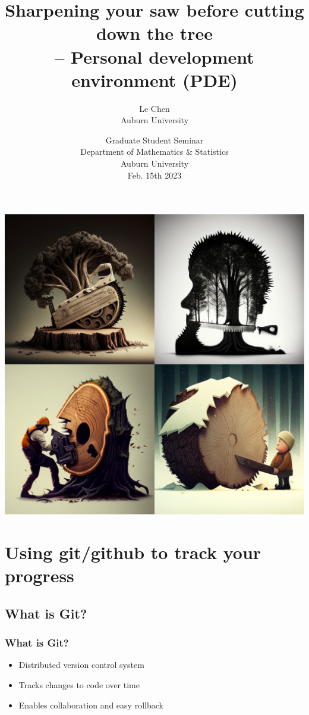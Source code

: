 \documentclass[9pt,table,xcolor=dvipsnames]{beamer}%
\title{Sharpening your saw before cutting down the tree
\\ -- Personal development environment (PDE)}%
\author{Le Chen\\
Auburn University
}
\institute[Auburn University]
{%
\pgfuseimage{Emory}
 }
\date[Columbus]{
  \footnotesize
  Graduate Student Seminar \\[1em]
  Department of Mathematics \& Statistics\\[0.5em]
  Auburn University\\[1em]
  Feb. 15th 2023\\
}
\theoremstyle{definition}
\theoremstyle{plain}
\begin{document}
\begin{frame}[noframenumbering]
  \titlepage
\end{frame}
\begin{frame}[fragile] %
  \bigskip
  \begin{center}
    \includegraphics[scale=0.25]{./figs/chenle02_Illustrate_the_idea_If_you_sharpen_the_saw_you_would.png}
  \end{center}
\end{frame}
\section{Using git/github to track your progress}
\subsection{What is Git?}
\begin{frame}
  \frametitle{What is Git?}
  \begin{itemize}
    \item Distributed version control system
    \item Tracks changes to code over time
    \item Enables collaboration and easy rollback
  \end{itemize}
\end{frame}
\end{document}
